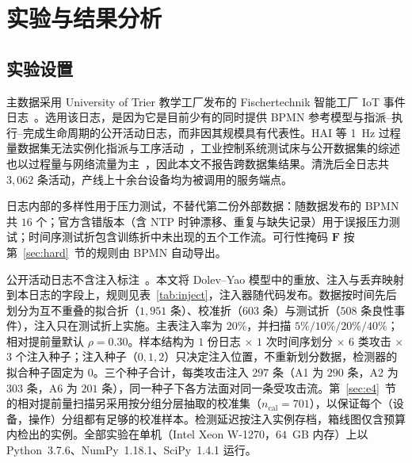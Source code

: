 \documentclass[manuscript,screen,review]{acmart}
\begin{document}
\section{实验与结果分析}
\label{sec:experiments}

\subsection{实验设置}
\label{sec:setup}

主数据采用 {University of Trier} 教学工厂发布的 {Fischertechnik} 智能工厂 {IoT} 事件日志~\cite{malburg2022trier}。选用该日志，是因为它是目前少有的同时提供 {BPMN} 参考模型与指派--执行--完成生命周期的公开活动日志，而非因其规模具有代表性。{HAI} 等 1~Hz 过程量数据集无法实例化指派与工序活动~\cite{shin2020hai}，工业控制系统测试床与公开数据集的综述也以过程量与网络流量为主~\cite{conti2021testbeds,dobler2025datasets}，因此本文不报告跨数据集结果。清洗后全日志共 $3{,}062$ 条活动，产线上十余台设备均为被调用的服务端点。

日志内部的多样性用于压力测试，不替代第二份外部数据：随数据发布的 {BPMN} 共 $16$ 个；官方含错版本（含 NTP 时钟漂移、重复与缺失记录）用于误报压力测试；时间序测试折包含训练折中未出现的五个工作流。可行性掩码 $\mathbf F$ 按第~\ref{sec:hard}~节的规则由 {BPMN} 自动导出。

公开活动日志不含注入标注~\cite{conti2021testbeds,dobler2025datasets}。本文将 {Dolev--Yao} 模型中的重放、注入与丢弃映射到本日志的字段上，规则见表~\ref{tab:inject}，注入器随代码发布。数据按时间先后划分为互不重叠的拟合折（$1{,}951$ 条）、校准折（$603$ 条）与测试折（$508$ 条良性事件），注入只在测试折上实施。主表注入率为 $20\%$，并扫描 $5\%/10\%/20\%/40\%$；相对提前量默认 $\rho=0.30$。样本结构为 $1$ 份日志 $\times$ $1$ 次时间序划分 $\times$ $6$ 类攻击 $\times$ $3$ 个注入种子；注入种子（$0,1,2$）只决定注入位置，不重新划分数据，检测器的拟合种子固定为 $0$。三个种子合计，每类攻击注入 $297$ 条（{A1} 为 $290$ 条，{A2} 为 $303$ 条，{A6} 为 $201$ 条），同一种子下各方法面对同一条受攻击流。第~\ref{sec:e4}~节的相对提前量扫描另采用按分组分层抽取的校准集（$n_{\mathrm{cal}}=701$），以保证每个（设备，操作）分组都有足够的校准样本。检测延迟按注入实例存档，箱线图仅含预算内检出的实例。全部实验在单机（{Intel Xeon W-1270}，$64$~GB 内存）上以 {Python}~3.7.6、{NumPy}~1.18.1、{SciPy}~1.4.1 运行。
\end{document}
